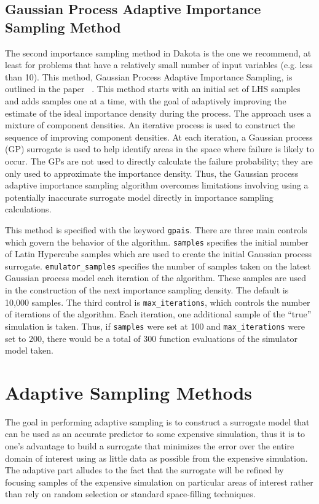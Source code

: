 \subsection{Gaussian Process Adaptive Importance Sampling Method}\label{uq:gpais}
The second importance sampling method in Dakota is the one we recommend,
at least for problems that have a relatively small number of input variables (e.g.
less than 10). This method, Gaussian Process Adaptive Importance Sampling,
is outlined in the paper ~\cite{Dalbey2012}.
This method  starts with an initial set of LHS samples and adds samples one at a time, 
with the goal of adaptively improving the estimate of the ideal importance density
during the process. The approach uses a mixture of component densities. An
iterative process is used
to construct the sequence of improving component densities. At each
iteration, a Gaussian process (GP) surrogate is used to help identify areas
in the space where failure is likely to occur. The GPs are not used to
directly calculate the failure probability; they are only used to approximate
the importance density. Thus, the Gaussian process adaptive importance
sampling algorithm overcomes limitations involving using a potentially
inaccurate surrogate model directly in importance sampling calculations.

This method is specified with the keyword \texttt{gpais}. There are three 
main controls which govern the behavior of the algorithm. 
\texttt{samples} specifies the initial number of Latin Hypercube samples 
which are used to create the initial Gaussian process surrogate. 
\texttt{emulator\_samples} specifies the number of samples taken on the 
latest Gaussian process model each iteration of the algorithm. 
These samples are used in the construction of the next importance 
sampling density. The default is 10,000 samples. The third control 
is \texttt{max\_iterations}, which controls the number of iterations 
of the algorithm. Each iteration, one additional sample of the ``true'' 
simulation is taken. Thus, if \texttt{samples} were set at 100 and 
\texttt{max\_iterations} were set to 200, there would be a total of 
300 function evaluations of the simulator model taken. 

\section{Adaptive Sampling Methods}\label{uq:adaptive}
The goal in performing adaptive sampling is to construct a surrogate model that
can be used as an accurate predictor to some expensive simulation, thus it is
to one's advantage to build a surrogate that minimizes the error over the entire
domain of interest using as little data as possible from the expensive
simulation. The adaptive part alludes to the fact that the surrogate will be
refined by focusing samples of the expensive simulation on particular areas of
interest rather than rely on random selection or standard space-filling
techniques. 

